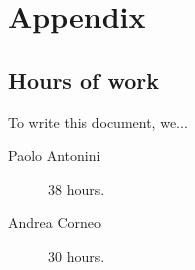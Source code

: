\chapter{Appendix}\label{chap:appendix}

\section{Hours of work}
To write this document, we... %

\begin{description}
	\item [Paolo Antonini] 38 hours.
	\item [Andrea Corneo] 30 hours.
\end{description}

